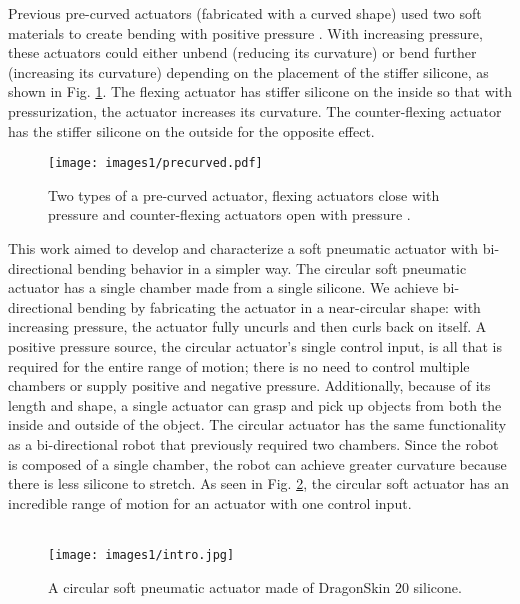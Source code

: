 Previous pre-curved actuators (fabricated with a curved shape) used two soft materials to create bending with positive pressure \cite{hu_precurved_2022}. With increasing pressure, these actuators could either unbend (reducing its curvature) or bend further (increasing its curvature) depending on the placement of the stiffer silicone, as shown in Fig. \ref{fig:precurved}. The flexing actuator has stiffer silicone on the inside so that with pressurization, the actuator increases its curvature. The counter-flexing actuator has the stiffer silicone on the outside for the opposite effect. \\

\begin{figure}[!ht]
    \centering
    \texttt{[image: images1/precurved.pdf]}
    \caption{Two types of a pre-curved actuator, flexing actuators close with pressure and counter-flexing actuators open with pressure \cite{hu_precurved_2022}.}
    \label{fig:precurved}
\end{figure}

This work aimed to develop and characterize a soft pneumatic actuator with bi-directional bending behavior in a simpler way. The circular soft pneumatic actuator has a single chamber made from a single silicone. We achieve bi-directional bending by fabricating the actuator in a near-circular shape: with increasing pressure, the actuator fully uncurls and then curls back on itself. A positive pressure source, the circular actuator's single control input, is all that is required for the entire range of motion; there is no need to control multiple chambers or supply positive and negative pressure. Additionally, because of its length and shape, a single actuator can grasp and pick up objects from both the inside and outside of the object. The circular actuator has the same functionality as a bi-directional robot that previously required two chambers. Since the robot is composed of a single chamber, the robot can achieve greater curvature because there is less silicone to stretch. As seen in Fig. \ref{fig:intro}, the circular soft actuator has an incredible range of motion for an actuator with one control input. \\ \\ 

\begin{figure}[!ht]
    \centering
    \texttt{[image: images1/intro.jpg]}
    \caption{A circular soft pneumatic actuator made of DragonSkin 20 silicone.}
    \label{fig:intro}
\end{figure}

